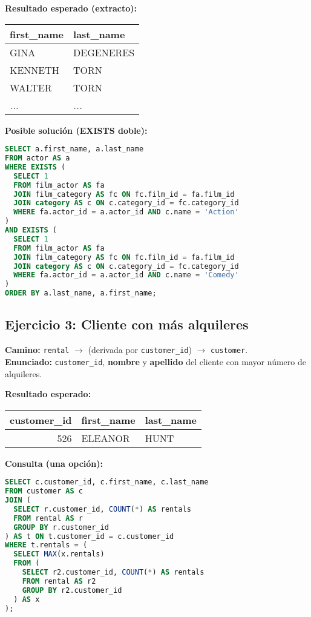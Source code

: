 \documentclass[12pt,a4paper]{article}
\begin{document}
\textbf{Resultado esperado (extracto):}
\begin{center}
\begin{tabular}{l l}
\hline
first\_name & last\_name \\
\hline
GINA    & DEGENERES \\
KENNETH & TORN \\
WALTER  & TORN \\
\textit{...} & \textit{...} \\
\hline
\end{tabular}
\end{center}


\textbf{Posible solución (EXISTS doble):}
\begin{lstlisting}[language=SQL]
SELECT a.first_name, a.last_name
FROM actor AS a
WHERE EXISTS (
  SELECT 1
  FROM film_actor AS fa
  JOIN film_category AS fc ON fc.film_id = fa.film_id
  JOIN category AS c ON c.category_id = fc.category_id
  WHERE fa.actor_id = a.actor_id AND c.name = 'Action'
)
AND EXISTS (
  SELECT 1
  FROM film_actor AS fa
  JOIN film_category AS fc ON fc.film_id = fa.film_id
  JOIN category AS c ON c.category_id = fc.category_id
  WHERE fa.actor_id = a.actor_id AND c.name = 'Comedy'
)
ORDER BY a.last_name, a.first_name;
\end{lstlisting}

\subsection*{Ejercicio 3: Cliente con más alquileres}
\textbf{Camino:} \texttt{rental} $\rightarrow$ (derivada por \texttt{customer\_id}) $\rightarrow$ \texttt{customer}. \\
\textbf{Enunciado:} \texttt{customer\_id}, \textbf{nombre} y \textbf{apellido} del cliente con mayor número de alquileres.



\textbf{Resultado esperado:}
\begin{center}
\begin{tabular}{r l l}
\hline
customer\_id & first\_name & last\_name \\
\hline
526 & ELEANOR & HUNT \\
\hline
\end{tabular}
\end{center}

\textbf{Consulta (una opción):}
\begin{lstlisting}[language=SQL]
SELECT c.customer_id, c.first_name, c.last_name
FROM customer AS c
JOIN (
  SELECT r.customer_id, COUNT(*) AS rentals
  FROM rental AS r
  GROUP BY r.customer_id
) AS t ON t.customer_id = c.customer_id
WHERE t.rentals = (
  SELECT MAX(x.rentals)
  FROM (
    SELECT r2.customer_id, COUNT(*) AS rentals
    FROM rental AS r2
    GROUP BY r2.customer_id
  ) AS x
);
\end{lstlisting}
\end{document}

